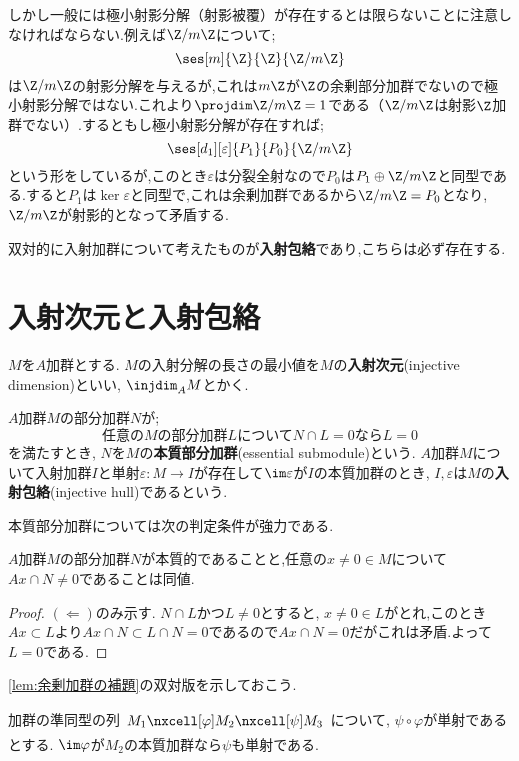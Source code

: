 しかし一般には極小射影分解（射影被覆）が存在するとは限らないことに注意しなければならない.例えば$\Z/m\Z$について;
\[\ses[m]{\Z}{\Z}{\Z/m\Z}\]
は$\Z/m\Z$の射影分解を与えるが,これは$m\Z$が$\Z$の余剰部分加群でないので極小射影分解ではない.これより$\projdim \Z/m\Z=1$である（$\Z/m\Z$は射影$\Z$加群でない）.するともし極小射影分解が存在すれば;
\[\ses[d_1][\varepsilon]{P_1}{P_0}{\Z/m\Z}\]
という形をしているが,このとき$\varepsilon$は分裂全射なので$P_0$は$P_1\oplus\Z/m\Z$と同型である.すると$P_1$は$\ker\varepsilon$と同型で,これは余剰加群であるから$\Z/m\Z=P_0$となり, $\Z/m\Z$が射影的となって矛盾する.

双対的に入射加群について考えたものが\textbf{入射包絡}であり,こちらは必ず存在する.

\section{入射次元と入射包絡}
\begin{defi}[入射次元]
	$M$を$A$加群とする. $M$の入射分解の長さの最小値を$M$の\textbf{入射次元}(injective dimension)といい, $\injdim_A M$とかく.
\end{defi}

\begin{defi}[入射包絡]
	$A$加群$M$の部分加群$N$が;
	\[\text{任意の$M$の部分加群$L$について$N\cap L=0$なら$L=0$}\]
	を満たすとき, $N$を$M$の\textbf{本質部分加群}(essential submodule)という. $A$加群$M$について入射加群$I$と単射$\varepsilon:M\to I$が存在して$\im\varepsilon$が$I$の本質加群のとき, $I,\varepsilon$は$M$の\textbf{入射包絡}(injective hull)であるという.
\end{defi}

本質部分加群については次の判定条件が強力である.
\begin{prop}\label{prop:本質的加群の判定条件}
	$A$加群$M$の部分加群$N$が本質的であることと,任意の$x\neq0\in M$について$Ax\cap N\neq0$であることは同値.
\end{prop}

\begin{proof}
	$(\Longleftarrow)$のみ示す. $N\cap L$かつ$L\neq0$とすると, $x\neq0\in L$がとれ,このとき$Ax\subset L$より$Ax\cap N\subset L\cap N=0$であるので$Ax\cap N=0$だがこれは矛盾.よって$L=0$である.
\end{proof}

\ref{lem:余剰加群の補題}の双対版を示しておこう.

\begin{lem}\label{lem:余剰加群の補題の双対}
	加群の準同型の列$\begin{tikzcd}
	M_1\nxcell[\varphi]M_2\nxcell[\psi]M_3
	\end{tikzcd}$について, $\psi\circ\varphi$が単射であるとする. $\im\varphi$が$M_2$の本質加群なら$\psi$も単射である.
\end{lem}

